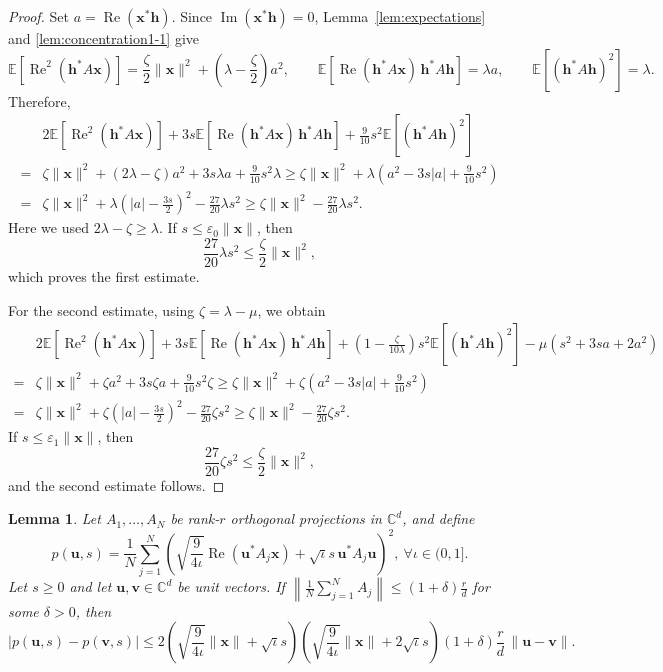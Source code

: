 \documentclass{article}
\newcommand{\C}{{\mathbb C}}
\newcommand{\E}{{\mathbb E}}
\newcommand{\vx}{{\mathbf x}}
\newcommand{\vv}{{\mathbf v}}
\newcommand{\vu}{{\mathbf u}}
\newcommand{\vh}{{\mathbf h}}
\newcommand{\0}{{\mathbf 0}}
\newtheorem{lemma}[theorem]{Lemma}
\numberwithin{equation}{section}
\begin{document}
	\begin{proof}
		Set $a=\operatorname{Re}(\vx^*\vh)$. Since $\operatorname{Im}(\vx^*\vh)=0$, Lemma~\ref{lem:expectations} and \ref{lem:concentration1-1} give
		\[
		\E\!\left[\operatorname{Re}^2(\vh^*A\vx)\right]
		=\frac{\zeta}{2}\|\vx\|^2+\left(\lambda-\frac{\zeta}{2}\right)a^2, \qquad\E\!\left[\operatorname{Re}(\vh^*A\vx)\,\vh^*A\vh\right]=\lambda a,
		\qquad
		\E\!\left[(\vh^*A\vh)^2\right]=\lambda.
		\]
		Therefore,
		\begin{align*}
			&2\E\!\left[\operatorname{Re}^2(\vh^*A\vx)\right]
			+3s\E\!\left[\operatorname{Re}(\vh^*A\vx)\,\vh^*A\vh\right]
			+\frac{9}{10}s^2\E\!\left[(\vh^*A\vh)^2\right]\\
			=&\zeta\|\vx\|^2+(2\lambda-\zeta)a^2+3s\lambda a+\frac{9}{10}s^2\lambda\ge\zeta\|\vx\|^2+\lambda\left(a^2-3s|a|+\frac{9}{10}s^2\right)\\
			=&\zeta\|\vx\|^2+\lambda\left(|a|-\frac{3s}{2}\right)^2-\frac{27}{20}\lambda s^2\ge\zeta\|\vx\|^2-\frac{27}{20}\lambda s^2.
		\end{align*}
		Here we used $2\lambda-\zeta\ge\lambda$. If $s\le\varepsilon_0\|\vx\|$, then
		\[
		\frac{27}{20}\lambda s^2\le\frac{\zeta}{2}\|\vx\|^2,
		\]
		which proves the first estimate.
		
		For the second estimate, using $\zeta=\lambda-\mu$, we obtain
		\begin{align*}
			&2\E\!\left[\operatorname{Re}^2(\vh^*A\vx)\right]
			+3s\E\!\left[\operatorname{Re}(\vh^*A\vx)\,\vh^*A\vh\right]
			+\left(1-\frac{\zeta}{10\lambda}\right)s^2\E\!\left[(\vh^*A\vh)^2\right]-\mu\left(s^2+3sa+2a^2\right)\\
			=&\zeta\|\vx\|^2+\zeta a^2+3s\zeta a+\frac{9}{10}s^2\zeta\ge\zeta\|\vx\|^2+\zeta\left(a^2-3s|a|+\frac{9}{10}s^2\right)\\
			=&\zeta\|\vx\|^2+\zeta\left(|a|-\frac{3s}{2}\right)^2-\frac{27}{20}\zeta s^2\ge\zeta\|\vx\|^2-\frac{27}{20}\zeta s^2.
		\end{align*}
		If $s\le\varepsilon_1\|\vx\|$, then
		\[
		\frac{27}{20}\zeta s^2\le\frac{\zeta}{2}\|\vx\|^2,
		\]
		and the second estimate follows.
	\end{proof}
	\begin{lemma}\label{lem:estimate_diff}
		Let $A_1,\ldots,A_N$ be rank-$r$ orthogonal projections in $\C^d$, and define 
		\[
		p(\vu,s)=\frac1N\sum_{j=1}^N
		\left(\sqrt{\frac{9}{4\iota}}\operatorname{Re}(\vu^*A_j\vx)
		+\sqrt{\iota}s\,\vu^*A_j\vu\right)^2,\ \forall\iota\in(0,1].
		\]
		Let $s\ge0$ and let $\vu,\vv\in\C^d$ be unit vectors. If $
		\left\|\frac1N\sum_{j=1}^NA_j\right\|
		\le (1+\delta)\frac rd$ 
		for some $\delta>0$, then
		\[
		|p(\vu,s)-p(\vv,s)|
		\le
		2\left(\sqrt{\frac{9}{4\iota}}\|\vx\|+\sqrt{\iota}s\right)
		\left(\sqrt{\frac{9}{4\iota}}\|\vx\|+2\sqrt{\iota}s\right)
		(1+\delta)\frac rd\,\|\vu-\vv\|.
		\]
	\end{lemma}
	
\end{document}
